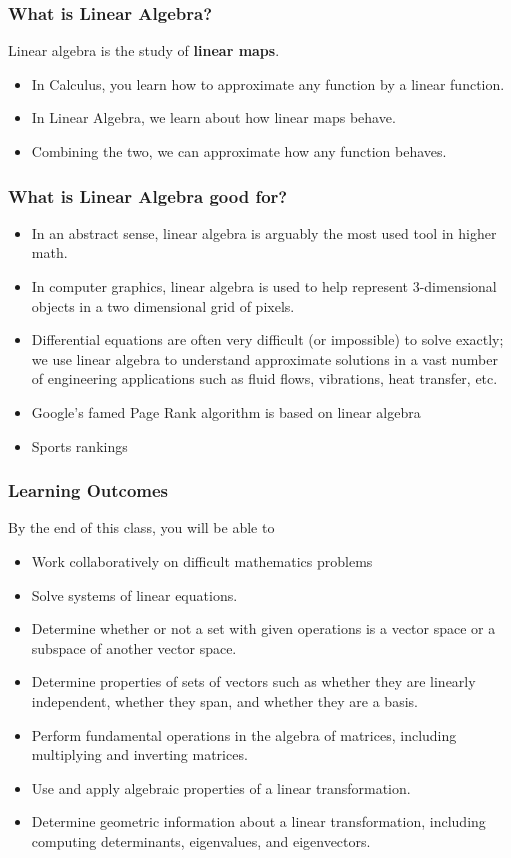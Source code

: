\documentclass[aspectration=1610]{beamer}
\begin{document}
\begin{frame} \frametitle{What is Linear Algebra? }
Linear algebra is the study of {\bf linear maps}.
\begin{itemize}
\item In Calculus, you learn how to approximate any function by a linear function.
\item In Linear Algebra, we learn about how linear maps behave.
\item Combining the two, we can approximate how any function behaves.
\end{itemize}
\end{frame}

\begin{frame} \frametitle{What is Linear Algebra good for?}
\begin{itemize}
\item In an abstract sense, linear algebra is arguably the most used tool in higher math.
\item In computer graphics, linear algebra is used to help represent 3-dimensional objects in a two dimensional grid of pixels.
\item Differential equations are often very difficult (or impossible) to solve exactly; we use linear algebra to understand approximate solutions in a vast number of engineering applications such as fluid flows, vibrations, heat transfer, etc.
\item Google's famed Page Rank algorithm is based on linear algebra
\item Sports rankings 
\end{itemize}
\end{frame}

\begin{frame} \frametitle{Learning Outcomes }
By the end of this class, you will be able to
\begin{itemize}
\item Work collaboratively on difficult mathematics problems
\pause \item Solve systems of linear equations.
\pause \item Determine whether or not a set with given operations is a vector space or a subspace of another vector space.
\pause \item Determine properties of sets of vectors such as whether they are linearly independent, whether they span, and whether they are a basis.
\pause \item Perform fundamental operations in the algebra of matrices, including multiplying and inverting matrices.
\pause \item Use and apply algebraic properties of a linear transformation.
\pause \item Determine geometric information about a linear transformation, including computing determinants, eigenvalues, and eigenvectors.
\end{itemize}
\end{frame}
\end{document}
